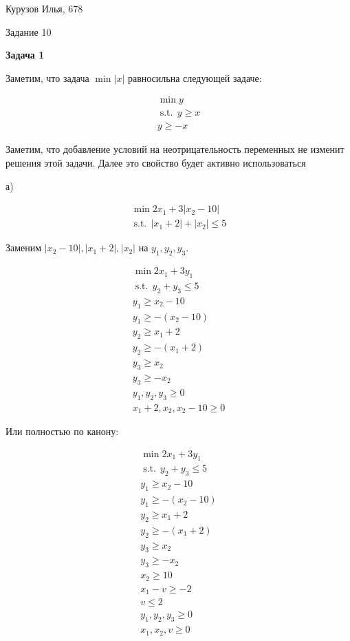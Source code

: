 \documentclass[12pt]{article}
\DeclareMathOperator*{\st}{s.t. }
\begin{document}
\begin{center}
	{Курузов Илья, 678}

	{Задание 10}
\end{center}

\begin{center}
	\textbf{Задача 1}
\end{center}

Заметим, что задача $\min |x|$ равносильна следующей задаче:

\begin{gather}
\min y\\
\st\,y\geq x\\
y\geq -x
\end{gather} 

Заметим, что добавление условий на неотрицательность переменных не изменит решения этой задачи. Далее это свойство будет активно использоваться

а) 

\begin{gather}
\min 2x_1+3|x_2-10|\\
\st\,|x_1+2|+|x_2|\leq 5
\end{gather} 

Заменим $|x_2-10|,|x_1+2|,|x_2|$ на $y_1, y_2,y_3$.

\begin{gather}
\min 2x_1+3y_1\\
\st\,y_2+y_3\leq 5\\
y_1 \geq x_2 - 10\\
y_1 \geq -(x_2 - 10)\\
y_2 \geq x_1 + 2\\
y_2 \geq -(x_1+2)\\
y_3 \geq x_2\\
y_3 \geq -x_2\\
y_1, y_2, y_3 \geq 0\\
x_1+2, x_2, x_2-10 \geq 0
\end{gather} 

Или полностью по канону:

\begin{gather}
\min 2x_1+3y_1\\
\st\,y_2+y_3\leq 5\\
y_1 \geq x_2 - 10\\
y_1 \geq -(x_2 - 10)\\
y_2 \geq x_1 + 2\\
y_2 \geq -(x_1+2)\\
y_3 \geq x_2\\
y_3 \geq -x_2\\
x_2 \geq 10\\
x_1 - v \geq -2\\
v \leq 2\\
y_1, y_2, y_3 \geq 0\\
x_1, x_2, v\geq 0
\end{gather} 
\end{document}
